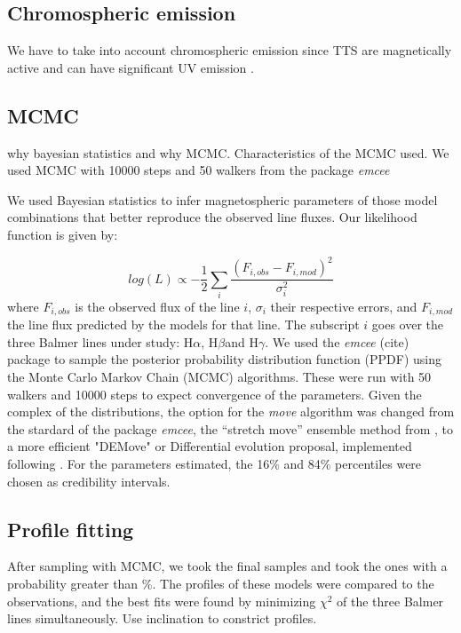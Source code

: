 \documentclass[twocolumn,linenumbers]{aastex631}
\newcommand{\halpha}{H$\alpha$}
\newcommand{\hbeta}{H$\beta$}
\newcommand{\hgamma}{H$\gamma$}
\begin{document}
\subsection{Chromospheric emission}

We have to take into account chromospheric emission since TTS are magnetically active and can have significant UV emission \citep{ingleby2013}.

\subsection{MCMC}

why bayesian statistics and why MCMC. Characteristics of the MCMC used. 
We used MCMC with 10000 steps and 50 walkers from the package \textit{emcee}

We used Bayesian statistics to infer magnetospheric parameters of those model combinations that better reproduce the observed line fluxes. Our likelihood function is given by:

\begin{equation}
    log (L) \propto -\frac{1}{2} \sum_i \frac{(F_{i,obs}-F_{i,mod})^2}{\sigma_{i}^2}
\end{equation}
where $F_{i,obs}$ is the observed flux of the line $i$, $\sigma_i$ their respective errors, and $F_{i,mod}$ the line flux predicted by the models for that line. The subscript $i$ goes over the three Balmer lines under study: \halpha, \hbeta and \hgamma. We used the \textit{emcee} (cite) package to sample the posterior probability distribution function (PPDF) using the Monte Carlo Markov Chain (MCMC) algorithms. These were run with 50 walkers and 10000 steps to expect convergence of the parameters. Given the complex of the distributions, the option for the \textit{move} algorithm was changed from the stardard of the package \textit{emcee}, the “stretch move” ensemble method from \citet{goodman-weare2010}, to a more efficient  "DEMove" or Differential evolution proposal, implemented following \citet{Nelson_2014}. For the parameters estimated, the 16\% and 84\% percentiles were chosen as credibility intervals.

\subsection{Profile fitting}

After sampling with MCMC, we took the final samples and took the ones with a probability greater than \%. The profiles of these models were compared to the observations, and the best fits were found by minimizing $\chi^2$ of the three Balmer lines simultaneously. Use inclination to constrict profiles.
\end{document}
